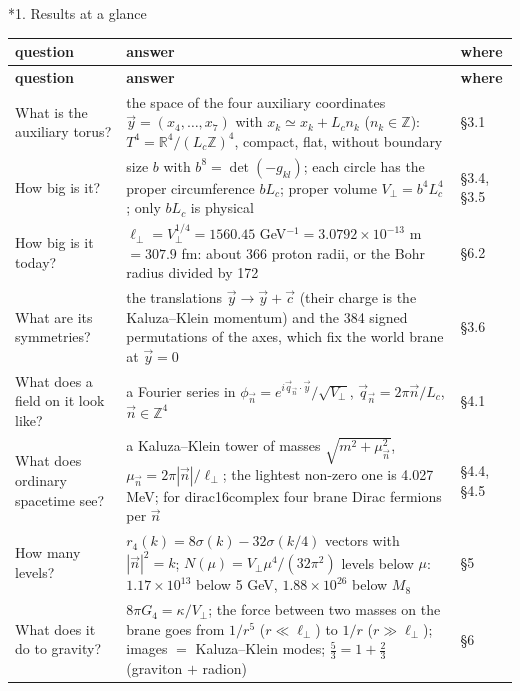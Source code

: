 \documentclass[10pt,a4paper]{article}
\makeatletter
\renewcommand\section{\@startsection{section}{1}{\z@}{-3.5ex \@plus -1ex \@minus -.2ex}{2.3ex \@plus.2ex}{\normalfont\Large\bfseries\raggedright}}
\makeatother
\begin{document}
\section*{1. Results at a glance}
{\footnotesize
\begin{longtable}{>{\raggedright\arraybackslash}p{}>{\raggedright\arraybackslash}p{}>{\raggedright\arraybackslash}p{}}
\toprule
\textbf{question} & \textbf{answer} & \textbf{where} \\
\midrule\endfirsthead
\toprule
\textbf{question} & \textbf{answer} & \textbf{where} \\
\midrule\endhead
\endfoot
\bottomrule\endlastfoot
What is the auxiliary torus? & the space of the four auxiliary coordinates $\vec y=(x_4,\dots,x_7)$ with $x_k\simeq x_k+L_cn_k$ ($n_k\in\mathbb Z$): $T^4=\mathbb R^4/(L_c\mathbb Z)^4$, compact, flat, without boundary & §3.1 \\
How big is it? & size $b$ with $b^8=\det(-g_{kl})$; each circle has the proper circumference $bL_c$; proper volume $V_\perp=b^4L_c^4$; only $bL_c$ is physical & §3.4, §3.5 \\
How big is it today? & $\ell_\perp=V_\perp^{1/4}=1560.45$ GeV$^{-1}=3.0792\times10^{-13}$ m $=307.9$ fm: about 366 proton radii, or the Bohr radius divided by 172 & §6.2 \\
What are its symmetries? & the translations $\vec y\to\vec y+\vec c$ (their charge is the Kaluza–Klein momentum) and the 384 signed permutations of the axes, which fix the world brane at $\vec y=0$ & §3.6 \\
What does a field on it look like? & a Fourier series in $\phi_{\vec n}=e^{i\vec q_{\vec n}\cdot\vec y}/\sqrt{V_\perp}$, $\vec q_{\vec n}=2\pi\vec n/L_c$, $\vec n\in\mathbb Z^4$ & §4.1 \\
What does ordinary spacetime see? & a Kaluza–Klein tower of masses $\sqrt{m^2+\mu_{\vec n}^2}$, $\mu_{\vec n}=2\pi|\vec n|/\ell_\perp$; the lightest non-zero one is 4.027 MeV; for dirac16complex four brane Dirac fermions per $\vec n$ & §4.4, §4.5 \\
How many levels? & $r_4(k)=8\sigma(k)-32\sigma(k/4)$ vectors with $|\vec n|^2=k$; $N(\mu)=V_\perp\mu^4/(32\pi^2)$ levels below $\mu$: $1.17\times10^{13}$ below 5 GeV, $1.88\times10^{26}$ below $M_8$ & §5 \\
What does it do to gravity? & $8\pi G_4=\kappa/V_\perp$; the force between two masses on the brane goes from $1/r^5$ ($r\ll\ell_\perp$) to $1/r$ ($r\gg\ell_\perp$); images $=$ Kaluza–Klein modes; $\frac53=1+\frac23$ (graviton $+$ radion) & §6 \\

\end{longtable}}
\end{document}

